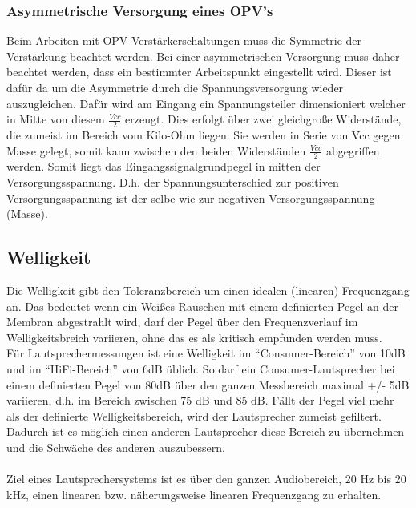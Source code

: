 \subsubsection*{Asymmetrische Versorgung eines OPV's}\label{subsec:8.5.1}
Beim Arbeiten mit OPV-Verstärkerschaltungen muss die Symmetrie der Verstärkung beachtet werden.
Bei einer asymmetrischen Versorgung muss daher beachtet werden, dass ein bestimmter Arbeitspunkt eingestellt wird.
Dieser ist dafür da um die Asymmetrie durch die Spannungsversorgung wieder auszugleichen.
Dafür wird am Eingang ein Spannungsteiler dimensioniert welcher in Mitte von diesem $\frac{Vcc}{2}$ erzeugt.
Dies erfolgt über zwei gleichgroße Widerstände, die zumeist im Bereich vom Kilo-Ohm liegen.
Sie werden in Serie von Vcc gegen Masse gelegt, somit kann zwischen den beiden Widerständen $\frac{Vcc}{2}$ abgegriffen werden.
Somit liegt das Eingangssignalgrundpegel in mitten der Versorgungsspannung.
D.h. der Spannungsunterschied zur positiven Versorgungsspannung ist der selbe wie zur negativen Versorgungsspannung (Masse). 

\subsection{Welligkeit} \label{sec:8.6}
Die Welligkeit gibt den Toleranzbereich um einen idealen (linearen) Frequenzgang an.
Das bedeutet wenn ein Weißes-Rauschen mit einem definierten Pegel an der Membran abgestrahlt wird, darf der Pegel über den Frequenzverlauf im Welligkeitsbreich variieren, ohne das es als kritisch empfunden werden muss. \\
Für Lautsprechermessungen ist eine Welligkeit im \enquote{Consumer-Bereich} von 10dB und im \enquote{HiFi-Bereich} von 6dB üblich.
So darf ein Consumer-Lautsprecher bei einem definierten Pegel von 80dB über den ganzen Messbereich maximal +/- 5dB variieren, d.h. im Bereich zwischen 75 dB und 85 dB.
Fällt der Pegel viel mehr als der definierte Welligkeitsbereich, wird der Lautsprecher zumeist gefiltert.
Dadurch ist es möglich einen anderen Lautsprecher diese Bereich zu übernehmen und die Schwäche des anderen auszubessern.\\ \\
Ziel eines Lautsprechersystems ist es über den ganzen Audiobereich, 20 Hz bis 20 kHz, einen linearen bzw. näherungsweise linearen Frequenzgang zu erhalten.


